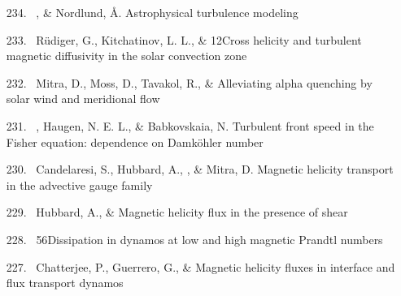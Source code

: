 \begin{itemize}
\item[{234.}~]
\Brandenburg, \& Nordlund, \AA.
{Astrophysical turbulence modeling}

\item[{233.}~]
R\"udiger, G., Kitchatinov, L. L., \& \Brandenburg{}
{12}{Cross helicity and turbulent magnetic diffusivity in the solar convection zone}

\item[{232.}~]
Mitra, D., Moss, D., Tavakol, R., \& \Brandenburg{}
{Alleviating alpha quenching by solar wind and meridional flow}

\item[{231.}~]
\Brandenburg, Haugen, N. E. L., \& Babkovskaia, N.
{Turbulent front speed in the Fisher equation: dependence on Damk\"ohler number}

\item[{230.}~]
Candelaresi, S., Hubbard, A., \Brandenburg, \& Mitra, D.
{Magnetic helicity transport in the advective gauge family}

\item[{229.}~]
Hubbard, A., \& \Brandenburg{}
{Magnetic helicity flux in the presence of shear}

\item[{228.}~]
\Brandenburg{}
{56}{Dissipation in dynamos at low and high magnetic Prandtl numbers}

\item[{227.}~]
Chatterjee, P., Guerrero, G., \& \Brandenburg{}
{Magnetic helicity fluxes in interface and flux transport dynamos}


\end{itemize}

